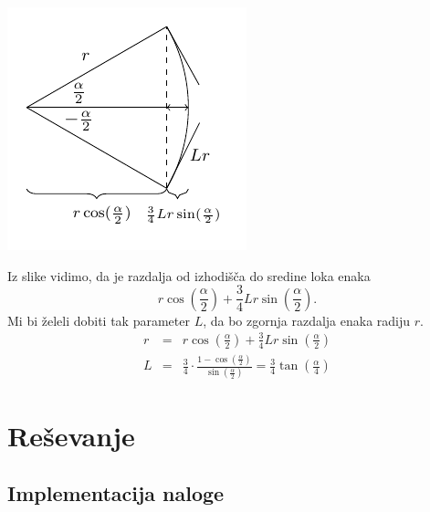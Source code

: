 \documentclass[a4paper,12pt]{article}
\begin{document}
	\noindent\hspace*{10em}
	\includegraphics[scale=1.5]{slika.pdf} 
	
	
	Iz slike vidimo, da je razdalja od izhodišča do sredine loka enaka 
	$$r\cos(\frac{\alpha}{2}) + \frac{3}{4}Lr\sin(\frac{\alpha}{2}).$$
	Mi bi želeli dobiti tak parameter $L$, da bo zgornja razdalja enaka radiju $r$.
	\begin{eqnarray*}
		r &=& r\cos(\frac{\alpha}{2}) + \frac{3}{4}Lr\sin(\frac{\alpha}{2})\\
		L &=& \frac{3}{4} \cdot \frac{1-\cos(\frac{\alpha}{2})}{\sin(\frac{\alpha}{2})} = \frac{3}{4}\tan(\frac{\alpha}{4})
	\end{eqnarray*}
	
	\section{Reševanje}
	\subsection{Implementacija naloge}
	
\end{document}
